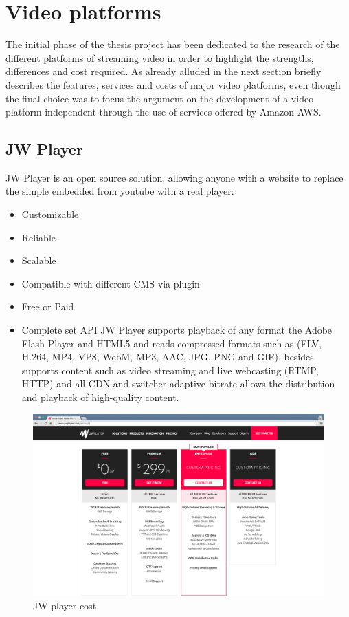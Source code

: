 \section{Video platforms}
\label{sec:Video platforms}

The initial phase of the thesis project has been dedicated to the research of the different platforms of streaming video in order to highlight the strengths, differences and cost required. As already alluded in the next section briefly describes the features, services and costs of major video platforms, even though the final choice was to focus the argument on the development of a video platform independent through the use of services offered by Amazon AWS.

\subsection{JW Player}
\label{sec:JW Player}
 JW Player is an open source solution, allowing anyone with a website to replace the simple embedded from youtube with a real player:

\begin{itemize}
\item Customizable
\item Reliable
\item Scalable
\item Compatible with different CMS via plugin
\item Free or Paid
\item Complete set API
JW Player supports playback of any format the Adobe Flash Player and HTML5 and reads compressed formats such as (FLV, H.264, MP4, VP8, WebM, MP3, AAC, JPG, PNG and GIF), besides supports content such as video streaming and live webcasting (RTMP, HTTP) and all CDN and switcher adaptive bitrate allows the distribution and playback of high-quality content.
\end{itemize}


\begin{figure}[htb]
 \centering
 \includegraphics[width=1.0\linewidth]{images/chapter2/jwtPLayer.png}\hfill
 \caption[JW player cost]{JW player cost}
 \label{fig:fourV}
\end{figure}

